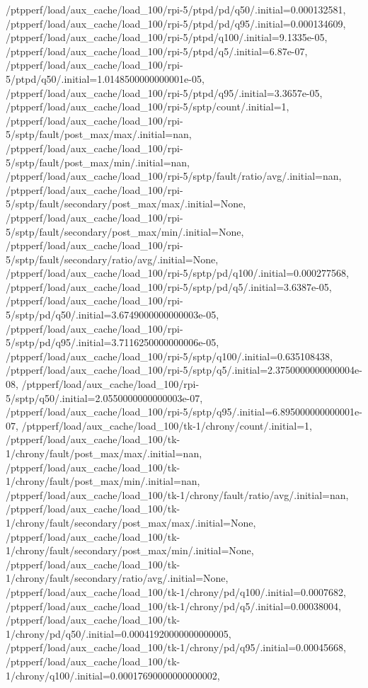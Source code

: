 {    /ptpperf/load/aux_cache/load_100/rpi-5/ptpd/pd/q50/.initial=0.000132581,
    /ptpperf/load/aux_cache/load_100/rpi-5/ptpd/pd/q95/.initial=0.000134609,
    /ptpperf/load/aux_cache/load_100/rpi-5/ptpd/q100/.initial=9.1335e-05,
    /ptpperf/load/aux_cache/load_100/rpi-5/ptpd/q5/.initial=6.87e-07,
    /ptpperf/load/aux_cache/load_100/rpi-5/ptpd/q50/.initial=1.0148500000000001e-05,
    /ptpperf/load/aux_cache/load_100/rpi-5/ptpd/q95/.initial=3.3657e-05,
    /ptpperf/load/aux_cache/load_100/rpi-5/sptp/count/.initial=1,
    /ptpperf/load/aux_cache/load_100/rpi-5/sptp/fault/post_max/max/.initial=nan,
    /ptpperf/load/aux_cache/load_100/rpi-5/sptp/fault/post_max/min/.initial=nan,
    /ptpperf/load/aux_cache/load_100/rpi-5/sptp/fault/ratio/avg/.initial=nan,
    /ptpperf/load/aux_cache/load_100/rpi-5/sptp/fault/secondary/post_max/max/.initial=None,
    /ptpperf/load/aux_cache/load_100/rpi-5/sptp/fault/secondary/post_max/min/.initial=None,
    /ptpperf/load/aux_cache/load_100/rpi-5/sptp/fault/secondary/ratio/avg/.initial=None,
    /ptpperf/load/aux_cache/load_100/rpi-5/sptp/pd/q100/.initial=0.000277568,
    /ptpperf/load/aux_cache/load_100/rpi-5/sptp/pd/q5/.initial=3.6387e-05,
    /ptpperf/load/aux_cache/load_100/rpi-5/sptp/pd/q50/.initial=3.6749000000000003e-05,
    /ptpperf/load/aux_cache/load_100/rpi-5/sptp/pd/q95/.initial=3.7116250000000006e-05,
    /ptpperf/load/aux_cache/load_100/rpi-5/sptp/q100/.initial=0.635108438,
    /ptpperf/load/aux_cache/load_100/rpi-5/sptp/q5/.initial=2.3750000000000004e-08,
    /ptpperf/load/aux_cache/load_100/rpi-5/sptp/q50/.initial=2.0550000000000003e-07,
    /ptpperf/load/aux_cache/load_100/rpi-5/sptp/q95/.initial=6.895000000000001e-07,
    /ptpperf/load/aux_cache/load_100/tk-1/chrony/count/.initial=1,
    /ptpperf/load/aux_cache/load_100/tk-1/chrony/fault/post_max/max/.initial=nan,
    /ptpperf/load/aux_cache/load_100/tk-1/chrony/fault/post_max/min/.initial=nan,
    /ptpperf/load/aux_cache/load_100/tk-1/chrony/fault/ratio/avg/.initial=nan,
    /ptpperf/load/aux_cache/load_100/tk-1/chrony/fault/secondary/post_max/max/.initial=None,
    /ptpperf/load/aux_cache/load_100/tk-1/chrony/fault/secondary/post_max/min/.initial=None,
    /ptpperf/load/aux_cache/load_100/tk-1/chrony/fault/secondary/ratio/avg/.initial=None,
    /ptpperf/load/aux_cache/load_100/tk-1/chrony/pd/q100/.initial=0.0007682,
    /ptpperf/load/aux_cache/load_100/tk-1/chrony/pd/q5/.initial=0.00038004,
    /ptpperf/load/aux_cache/load_100/tk-1/chrony/pd/q50/.initial=0.00041920000000000005,
    /ptpperf/load/aux_cache/load_100/tk-1/chrony/pd/q95/.initial=0.00045668,
    /ptpperf/load/aux_cache/load_100/tk-1/chrony/q100/.initial=0.00017690000000000002,
}
